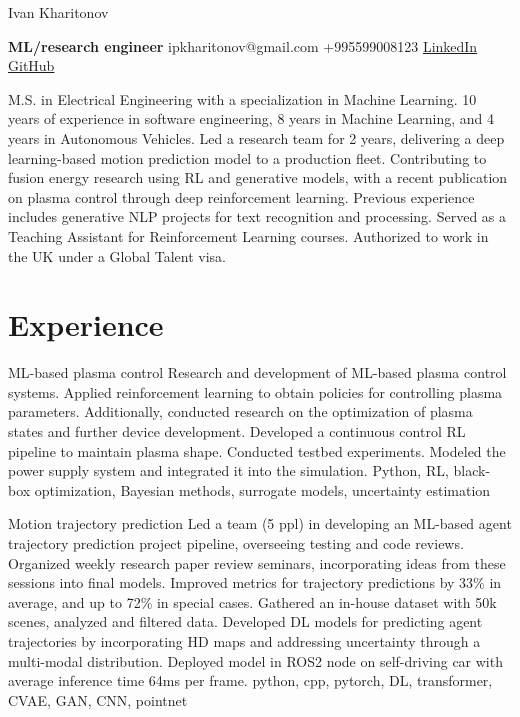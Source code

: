 \documentclass[]{resume}
\begin{document}
\begin{center}
	\Huge Ivan Kharitonov \par
	\normalsize  \textbf{ML/research engineer} \hfill ipkharitonov@gmail.com \hfill +995599008123 \hfill \href{https://www.linkedin.com/in/ivan-kharitonov-main/}{LinkedIn} \hfill \href{https://github.com/kharitonov-ivan}{GitHub}
\end{center}
\vspace{-1em}

\noindent M.S. in Electrical Engineering with a specialization in Machine Learning. 10 years of experience in software engineering, 8 years in Machine Learning, and 4 years in Autonomous Vehicles. Led a research team for 2 years, delivering a deep learning-based motion prediction model to a production fleet. Contributing to fusion energy research using RL and generative models, with a recent publication on plasma control through deep reinforcement learning. Previous experience includes generative NLP projects for text recognition and processing. Served as a Teaching Assistant for Reinforcement Learning courses. Authorized to work in the UK under a Global Talent visa.

\section*{\sectionformat Experience}
\project
{ML-based plasma control}
{Research and development of ML-based plasma control systems. Applied reinforcement learning to obtain policies for controlling plasma parameters. Additionally, conducted research on the optimization of plasma states and further device development.}
{Developed a continuous control RL pipeline to maintain plasma shape. Conducted testbed experiments. Modeled the power supply system and integrated it into the simulation.}
{Python, RL, black-box optimization, Bayesian methods, surrogate models, uncertainty estimation}

\project
{Motion trajectory prediction}
{Led a team (5 ppl) in developing an ML-based agent trajectory prediction project pipeline, overseeing testing and code reviews. Organized weekly research paper review seminars, incorporating ideas from these sessions into final models.}
{Improved metrics for trajectory predictions by 33\% in average, and up to 72\% in special cases. Gathered an in-house dataset with 50k scenes, analyzed and filtered data. Developed DL models for predicting agent trajectories by incorporating HD maps and addressing uncertainty through a multi-modal distribution. Deployed model in ROS2 node on self-driving car with average inference time 64ms per frame.}
{python, cpp, pytorch, DL, transformer, CVAE, GAN, CNN, pointnet}
\end{document}
